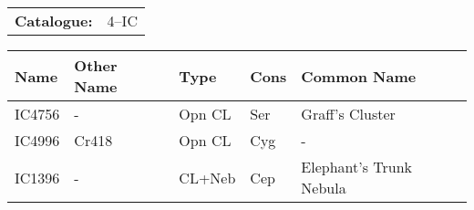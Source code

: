 \begin{tabular}{ p{0.9in} p{1.3in}}
{\bf Catalogue:} & 4--IC \\ 
\end{tabular}
\centering 
\begin{longtable}{ p{0.7in}  p{1.0in}  p{0.6in}  p{0.9in}  p{4.0in} }
\hline 
{\bf Name} & {\bf Other Name} & {\bf Type} & {\bf Cons} & {\bf Common Name} \\ 
\hline 
IC4756 & - & Opn CL & Ser & Graff's Cluster \\ 
IC4996 & Cr418 & Opn CL & Cyg & - \\ 
IC1396 & - & CL+Neb & Cep & Elephant's Trunk Nebula \\ 
\hline 
\end{longtable} 
